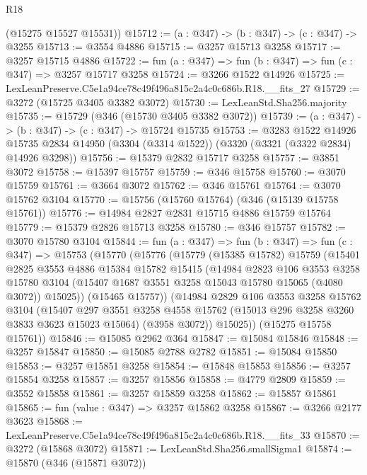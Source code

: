 \begin{lexlean}{R18}
\begin{coremodule}
      (@15275 @15527 @15531))
@15712 := (a : @347) -> (b : @347) -> (c : @347) -> @3255
@15713 := @3554 @4886
@15715 := @3257 @15713 @3258
@15717 := @3257 @15715 @4886
@15722 := fun (a : @347) => fun (b : @347) => fun (c : @347) => @3257 @15717 @3258
@15724 := @3266 @1522 @14926
@15725 := LexLeanPreserve.C5e1a94ce78c49f496a815c2a4c0c686b.R18.__fits_27
@15729 := @3272 (@15725 @3405 @3382 @3072)
@15730 := LexLeanStd.Sha256.majority
@15735 := @15729 (@346 (@15730 @3405 @3382 @3072))
@15739 := (a : @347) -> (b : @347) -> (c : @347) -> @15724 @15735
@15753 := @3283
    @1522
    @14926
    @15735
    @2834
    @14950
    (@3304 (@3314 @1522))
    (@3320 (@3321 (@3322 @2834) @14926 @3298))
@15756 := @15379 @2832 @15717 @3258
@15757 := @3851 @3072
@15758 := @15397 @15757
@15759 := @346 @15758
@15760 := @3070 @15759
@15761 := @3664 @3072
@15762 := @346 @15761
@15764 := @3070 @15762 @3104
@15770 := @15756 (@15760 @15764) (@346 (@15139 @15758 @15761))
@15776 := @14984 @2827 @2831 @15715 @4886 @15759 @15764
@15779 := @15379 @2826 @15713 @3258
@15780 := @346 @15757
@15782 := @3070 @15780 @3104
@15844 := fun (a : @347) =>
  fun (b : @347) =>
  fun (c : @347) =>
  @15753
    (@15770
      (@15776
        (@15779
          (@15385 @15782)
          @15759
          (@15401
            @2825
            @3553
            @4886
            @15384
            @15782
            @15415
            (@14984
              @2823
              @106
              @3553
              @3258
              @15780
              @3104
              (@15407 @1687 @3551 @3258 @15043 @15780 @15065 (@4080 @3072))
              @15025))
          (@15465 @15757))
        (@14984
          @2829
          @106
          @3553
          @3258
          @15762
          @3104
          (@15407
            @297
            @3551
            @3258
            @4558
            @15762
            (@15013 @296 @3258 @3260 @3833 @3623 @15023 @15064)
            (@3958 @3072))
          @15025))
      (@15275 @15758 @15761))
@15846 := @15085 @2962 @364
@15847 := @15084 @15846
@15848 := @3257 @15847
@15850 := @15085 @2788 @2782
@15851 := @15084 @15850
@15853 := @3257 @15851 @3258
@15854 := @15848 @15853
@15856 := @3257 @15854 @3258
@15857 := @3257 @15856
@15858 := @4779 @2809
@15859 := @3552 @15858
@15861 := @3257 @15859 @3258
@15862 := @15857 @15861
@15865 := fun (value : @347) => @3257 @15862 @3258
@15867 := @3266 @2177 @3623
@15868 := LexLeanPreserve.C5e1a94ce78c49f496a815c2a4c0c686b.R18.__fits_33
@15870 := @3272 (@15868 @3072)
@15871 := LexLeanStd.Sha256.smallSigma1
@15874 := @15870 (@346 (@15871 @3072))

\end{coremodule}
\end{lexlean}
